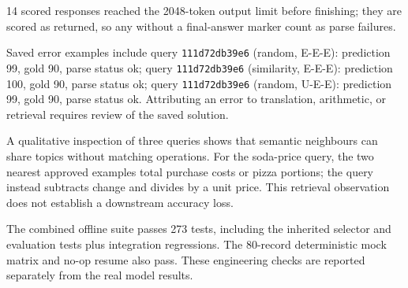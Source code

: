 14 scored responses reached the 2048-token output limit before finishing; they are scored as returned, so any without a final-answer marker count as parse failures.

Saved error examples include query \texttt{111d72db39e6} (random, E-E-E): prediction 99, gold 90, parse status ok; query \texttt{111d72db39e6} (similarity, E-E-E): prediction 100, gold 90, parse status ok; query \texttt{111d72db39e6} (random, U-E-E): prediction 99, gold 90, parse status ok. Attributing an error to translation, arithmetic, or retrieval requires review of the saved solution.

A qualitative inspection of three queries shows that semantic neighbours can share topics without matching operations. For the soda-price query, the two nearest approved examples total purchase costs or pizza portions; the query instead subtracts change and divides by a unit price. This retrieval observation does not establish a downstream accuracy loss.

The combined offline suite passes 273 tests, including the inherited selector and evaluation tests plus integration regressions. The 80-record deterministic mock matrix and no-op resume also pass. These engineering checks are reported separately from the real model results.
